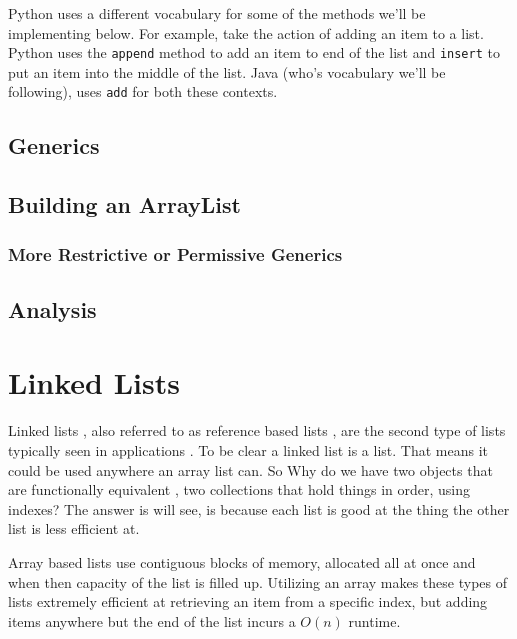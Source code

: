 \documentclass[10pt,a4paper]{book}
\begin{document}
Python uses a different vocabulary for some of the methods we'll be implementing below.  
For example, take the action of adding an item to a list.
Python uses the \texttt{append} method to add an item to end of the list and \texttt{insert} to put an item into the middle of the list.
Java (who's vocabulary we'll be following), uses \texttt{add} for both these contexts. 



\section{Generics}
\section{Building an ArrayList}
\label{buildingArraylist}

\subsection{More Restrictive or Permissive Generics}

\section{Analysis}
\chapter{Linked Lists}
Linked lists , also referred to as reference based lists , are the second type of lists typically seen in applications . To be clear a linked list is a list. That means it could be used anywhere an array list can.   So Why do we have two objects that are functionally equivalent , two collections that hold things in order, using indexes?  The answer is will see, is because each list is good at the thing the other list is less efficient at.


Array based lists use contiguous blocks of memory, allocated all at once and when then capacity of the list is filled up.  Utilizing an array makes these types of lists extremely efficient at retrieving an item from a specific index, but adding items anywhere but the end of the list incurs a $O(n)$ runtime.
\end{document}
